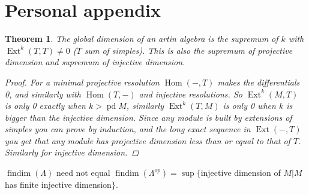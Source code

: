 \documentclass[11pt, a4paper, english]{article}
\newtheorem{theorem}{Theorem}[section]
\theoremstyle{definition}
\DeclareMathOperator{\Hom}{Hom}
\DeclareMathOperator{\Ext}{Ext}
\DeclareMathOperator{\findim}{findim}
\DeclareMathOperator{\pd}{pd}
\begin{document}
\section{Personal appendix}
\begin{theorem}
	The global dimension of an artin algebra is the supremum of $k$ with $\Ext^k(T,T)\neq 0$ ($T$ sum of simples). This is also the supremum of projective dimension and supremum of injective dimension.
	\begin{proof}
		For a minimal projective resolution $\Hom(-,T)$ makes the differentials 0, and similarly with $\Hom(T,-)$ and injective resolutions. So $\Ext^k(M, T)$ is only 0 exactly when $k>\pd M$, similarly $\Ext^k(T,M)$ is only 0 when $k$ is bigger than the injective dimension. Since any module is built by extensions of simples you can prove by induction, and the long exact sequence in $\Ext(-,T)$ you get that any module has projective dimension less than or equal to that of $T$. Similarly for injective dimension.
	\end{proof}
\end{theorem}

$\findim(\Lambda)$ need not equal $\findim(\Lambda^{op}) = \sup\{ $injective dimension of $M | M$ has finite injective dimension$ \}$.
\end{document}
